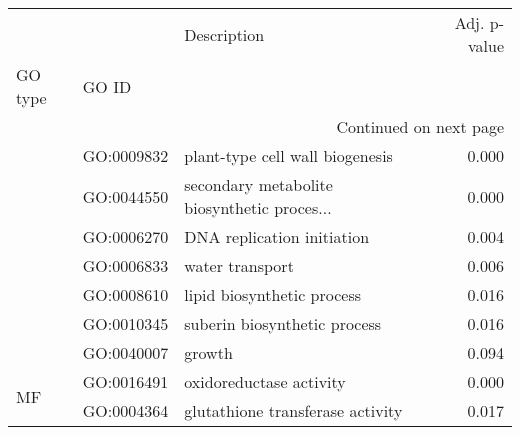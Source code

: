\begin{longtable}{lllr}
\toprule
   &            &                                  Description &  Adj. p-value \\
GO type & GO ID &                                              &               \\
\midrule
\endhead
\midrule
\multicolumn{4}{r}{{Continued on next page}} \\
\midrule
\endfoot

\bottomrule
\endlastfoot
\multirow{7}{*}{BP} & GO:0009832 &              plant-type cell wall biogenesis &         0.000 \\
   & GO:0044550 &  secondary metabolite biosynthetic proces... &         0.000 \\
   & GO:0006270 &                   DNA replication initiation &         0.004 \\
   & GO:0006833 &                              water transport &         0.006 \\
   & GO:0008610 &                   lipid biosynthetic process &         0.016 \\
   & GO:0010345 &                 suberin biosynthetic process &         0.016 \\
   & GO:0040007 &                                       growth &         0.094 \\
\cline{1-4}
\multirow{2}{*}{MF} & GO:0016491 &                      oxidoreductase activity &         0.000 \\
   & GO:0004364 &             glutathione transferase activity &         0.017 \\
\end{longtable}
